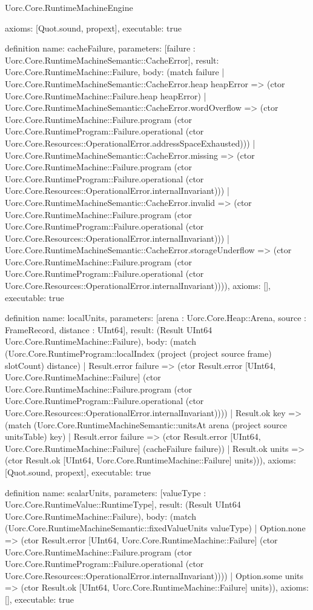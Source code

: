 \begin{lexlean}{Uorc.Core.RuntimeMachineEngine}
\begin{semanticmodule}
{  axioms: [Quot.sound, propext],
  executable: true
}

definition{
  name: cacheFailure,
  parameters: [failure : Uorc.Core.RuntimeMachineSemantic::CacheError],
  result: Uorc.Core.RuntimeMachine::Failure,
  body: (match failure
    | Uorc.Core.RuntimeMachineSemantic::CacheError.heap heapError => (ctor Uorc.Core.RuntimeMachine::Failure.heap heapError)
    | Uorc.Core.RuntimeMachineSemantic::CacheError.wordOverflow => (ctor Uorc.Core.RuntimeMachine::Failure.program (ctor Uorc.Core.RuntimeProgram::Failure.operational (ctor Uorc.Core.Resources::OperationalError.addressSpaceExhausted)))
    | Uorc.Core.RuntimeMachineSemantic::CacheError.missing => (ctor Uorc.Core.RuntimeMachine::Failure.program (ctor Uorc.Core.RuntimeProgram::Failure.operational (ctor Uorc.Core.Resources::OperationalError.internalInvariant)))
    | Uorc.Core.RuntimeMachineSemantic::CacheError.invalid => (ctor Uorc.Core.RuntimeMachine::Failure.program (ctor Uorc.Core.RuntimeProgram::Failure.operational (ctor Uorc.Core.Resources::OperationalError.internalInvariant)))
    | Uorc.Core.RuntimeMachineSemantic::CacheError.storageUnderflow => (ctor Uorc.Core.RuntimeMachine::Failure.program (ctor Uorc.Core.RuntimeProgram::Failure.operational (ctor Uorc.Core.Resources::OperationalError.internalInvariant)))),
  axioms: [],
  executable: true
}

definition{
  name: localUnits,
  parameters: [arena : Uorc.Core.Heap::Arena, source : FrameRecord, distance : UInt64],
  result: (Result UInt64 Uorc.Core.RuntimeMachine::Failure),
  body: (match (Uorc.Core.RuntimeProgram::localIndex (project (project source frame) slotCount) distance)
    | Result.error failure => (ctor Result.error [UInt64, Uorc.Core.RuntimeMachine::Failure] (ctor Uorc.Core.RuntimeMachine::Failure.program (ctor Uorc.Core.RuntimeProgram::Failure.operational (ctor Uorc.Core.Resources::OperationalError.internalInvariant))))
    | Result.ok key => (match (Uorc.Core.RuntimeMachineSemantic::unitsAt arena (project source unitsTable) key)
      | Result.error failure => (ctor Result.error [UInt64, Uorc.Core.RuntimeMachine::Failure] (cacheFailure failure))
      | Result.ok units => (ctor Result.ok [UInt64, Uorc.Core.RuntimeMachine::Failure] units))),
  axioms: [Quot.sound, propext],
  executable: true
}

definition{
  name: scalarUnits,
  parameters: [valueType : Uorc.Core.RuntimeValue::RuntimeType],
  result: (Result UInt64 Uorc.Core.RuntimeMachine::Failure),
  body: (match (Uorc.Core.RuntimeMachineSemantic::fixedValueUnits valueType)
    | Option.none => (ctor Result.error [UInt64, Uorc.Core.RuntimeMachine::Failure] (ctor Uorc.Core.RuntimeMachine::Failure.program (ctor Uorc.Core.RuntimeProgram::Failure.operational (ctor Uorc.Core.Resources::OperationalError.internalInvariant))))
    | Option.some units => (ctor Result.ok [UInt64, Uorc.Core.RuntimeMachine::Failure] units)),
  axioms: [],
  executable: true
}


\end{semanticmodule}
\end{lexlean}
